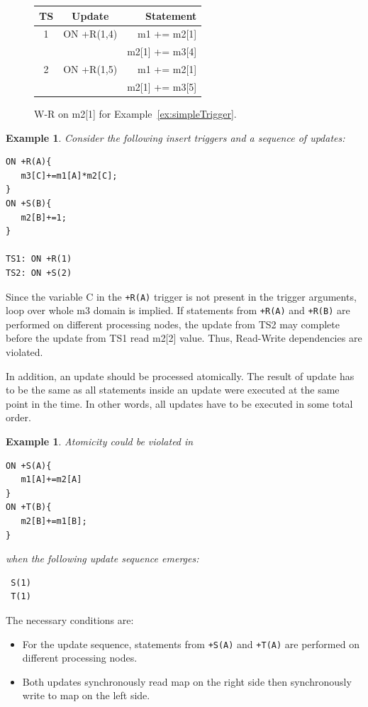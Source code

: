 \documentclass{sig-semester}
\newtheorem{example}[theorem]{Example}
\begin{document}
\begin{figure}
\begin{center}

\begin{tabular}{c|c|r}
TS & Update & Statement\\
\hline
1 & ON +R(1,4) & m1 += m2[1]    \\
  &            & m2[1] += m3[4] \\
\hline
2 & ON +R(1,5) & m1 += m2[1]    \\
  &            & m2[1] += m3[5] \\
\end{tabular}
\end{center}

\vspace{-3mm}
\caption{W-R on m2[1] for Example~\ref{ex:simpleTrigger}.}
\label{fig:streamWR}
\vspace{-2mm}
\end{figure}



\begin{example} \em
\label{ex:foreachTrigger}
Consider the following insert triggers and a sequence of updates:
\begin{verbatim}
ON +R(A){
   m3[C]+=m1[A]*m2[C];
}
ON +S(B){
   m2[B]+=1;
}

TS1: ON +R(1)
TS2: ON +S(2)
\end{verbatim}
\end{example}

Since the variable C in the \texttt{+R(A)} trigger is not present in the trigger arguments, loop over whole m3 domain is implied. If statements from \texttt{+R(A)} and \texttt{+R(B)} are performed on different processing nodes, the update from TS2 may complete before the update from TS1 read m2[2] value. Thus, Read-Write dependencies are violated.

In addition, an update should be processed atomically. The result of update has to be the same as all statements inside an update were executed at the same point in the time. In other words, all updates have to be executed in some total order.

\begin{example} \em
\label{ex:mulInput}
Atomicity could be violated in
\begin{verbatim}
ON +S(A){
   m1[A]+=m2[A]
}
ON +T(B){
   m2[B]+=m1[B];
}\end{verbatim}
when the following update sequence emerges:
\begin{verbatim}
 S(1)
 T(1)
\end{verbatim}
\end{example}
The necessary conditions are:
\begin{itemize}
 \item For the update sequence, statements from \texttt{+S(A)} and \texttt{+T(A)} are performed on different processing nodes.
 \item Both updates synchronously read map on the right side then synchronously write to map on the left side. 
\end{itemize}
\end{document}
